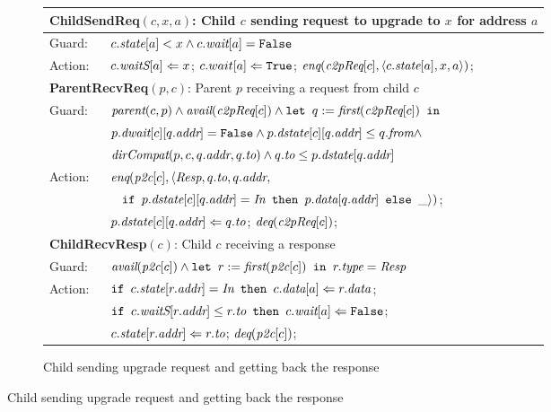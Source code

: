 \begin{figure}
\small
\centering
\begin{subfigure}{\textwidth}
\centering
\begin{tabular}{|ll|}
\hline
\multicolumn{2}{|l|}{\textbf{ChildSendReq}$(c, x, a)$: Child $c$ sending request to upgrade to $x$ for address $a$}\\
\hline
Guard: & $c.\textit{state}[a] < x \wedge c.\textit{wait}[a] = \texttt{False}$\\
\hline
Action: & $c.\textit{waitS}[a] \Leftarrow x$; $c.wait[a] \Leftarrow \texttt{True}$; $\textit{enq}(\textit{c2pReq}[c], \langle c.\textit{state}[a], x, a \rangle)$;\\
\hline
\hline
\multicolumn{2}{|l|}{\textbf{ParentRecvReq}$(p, c)$: Parent $p$ receiving a request from child $c$}\\
\hline
Guard: & 
$\textit{parent}(c,p) \wedge \textit{avail}(\textit{c2pReq}[c]) \wedge \texttt{let } q := \textit{first}(\textit{c2pReq}[c]) \texttt{ in }$\\
& $p.\textit{dwait}[c][q.\textit{addr}] = \texttt{False} \wedge p.\textit{dstate}[c][q.\textit{addr}] \le q.\textit{from} \wedge$\\
& $\textit{dirCompat}(p, c, q.\textit{addr}, q.\textit{to}) \wedge q.\textit{to} \le p.\textit{dstate}[q.\textit{addr}]$\\
\hline
Action: & $\textit{enq}(\textit{p2c}[c], \langle \textit{Resp}, q.\textit{to}, q.\textit{addr}, $\\
& $\;\;\;%
\myif p.\dstate[c][q.\addr] = \In \mythen p.\data[q.\addr] \myelse \_\rangle)$;\\
& $p.\textit{dstate}[c][q.\textit{addr}] \Leftarrow q.\textit{to}$; $\textit{deq}(\textit{c2pReq}[c])$;\\
\hline
\hline
\multicolumn{2}{|l|}{\textbf{ChildRecvResp}$(c)$: Child $c$ receiving a response}\\
\hline
Guard: & 
$\textit{avail}(\textit{p2c}[c]) \wedge \texttt{let } r := \textit{first}(\textit{p2c}[c]) \texttt{ in } r.\textit{type} = \textit{Resp}$\\
\hline
Action: & $\texttt{if } c.\textit{state}[r.\textit{addr}] = \textit{In} \texttt{ then } c.\textit{data}[a] \Leftarrow r.\textit{data}$;\\
&$\texttt{if } c.\textit{waitS}[r.\textit{addr}] \le r.\textit{to} \texttt{ then } c.\textit{wait}[a] \Leftarrow \texttt{False} $;\\
& $c.\textit{state}[r.\textit{addr}] \Leftarrow r.\textit{to}$; $\textit{deq}(\textit{p2c}[c])$;\\
\hline
\end{tabular}
\caption{Child sending upgrade request and getting back the response}
\label{childside}
\end{subfigure}


\end{figure}
